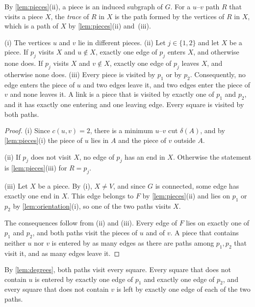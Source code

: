 \documentclass[pdflatex,sn-mathphys-num]{sn-jnl}%
\theoremstyle{thmstyleone}%
\theoremstyle{thmstyletwo}%
\theoremstyle{thmstylethree}%
\begin{document}
By \cref{lem:pieces}(ii), a piece is an induced subgraph of $G$.
For a $u$--$v$ path $R$ that visits a piece $X$, the \emph{trace} of $R$ in $X$ is the path formed by the vertices of $R$ in $X$, which is a path of $X$ by \cref{lem:pieces}(ii) and~(iii).

\begin{lemma}
\label{lem:degrees}
(i) The vertices $u$ and $v$ lie in different pieces.
(ii) Let $j \in \{1, 2\}$ and let $X$ be a piece.
If $p_j$ visits $X$ and $u \notin X$, exactly one edge of $p_j$ enters $X$, and otherwise none does.
If $p_j$ visits $X$ and $v \notin X$, exactly one edge of $p_j$ leaves $X$, and otherwise none does.
(iii) Every piece is visited by $p_1$ or by $p_2$.
Consequently, no edge enters the piece of $u$ and two edges leave it, and two edges enter the piece of $v$ and none leaves it.
A link is a piece that is visited by exactly one of $p_1$ and $p_2$, and it has exactly one entering and one leaving edge.
Every square is visited by both paths.
\end{lemma}

\begin{proof}
(i) Since $c(u, v) = 2$, there is a minimum $u$--$v$ cut $\delta(A)$, and by \cref{lem:pieces}(i) the piece of $u$ lies in $A$ and the piece of $v$ outside $A$.

(ii) If $p_j$ does not visit $X$, no edge of $p_j$ has an end in $X$.
Otherwise the statement is \cref{lem:pieces}(iii) for $R = p_j$.

(iii) Let $X$ be a piece.
By (i), $X \neq V$, and since $G$ is connected, some edge has exactly one end in $X$.
This edge belongs to $F$ by \cref{lem:pieces}(ii) and lies on $p_1$ or $p_2$ by \cref{lem:orientation}(i), so one of the two paths visits $X$.

The consequences follow from (ii) and (iii).
Every edge of $F$ lies on exactly one of $p_1$ and $p_2$, and both paths visit the pieces of $u$ and of $v$.
A piece that contains neither $u$ nor $v$ is entered by as many edges as there are paths among $p_1, p_2$ that visit it, and as many edges leave it.
\end{proof}

By \cref{lem:degrees}, both paths visit every square.
Every square that does not contain $u$ is entered by exactly one edge of $p_1$ and exactly one edge of $p_2$, and every square that does not contain $v$ is left by exactly one edge of each of the two paths.
\end{document}
